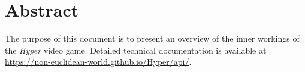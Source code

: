 \section{Abstract}
The purpose of this document is to present an overview of the inner workings of the \textit{Hyper} video game.
Detailed technical documentation is available at \url{https://non-euclidean-world.github.io/Hyper/api/}.